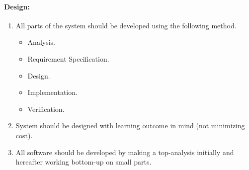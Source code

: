 \paragraph{Design:}
\begin{enumerate}[resume]
	\item All parts of the system should be developed using the following method. 
	\begin{itemize}
	 	\item Analysis.
	 	\item Requirement Specification.
	 	\item Design.
	 	\item Implementation.
	 	\item Verification.
	 \end{itemize} 
	 \item System should be designed with learning outcome in mind (not minimizing cost).
	 \item All software should be developed by making a top-analysis initially and hereafter working bottom-up on small parts. 
\end{enumerate}